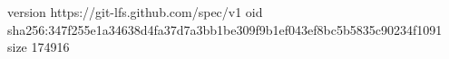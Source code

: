 version https://git-lfs.github.com/spec/v1
oid sha256:347f255e1a34638d4fa37d7a3bb1be309f9b1ef043ef8bc5b5835c90234f1091
size 174916
